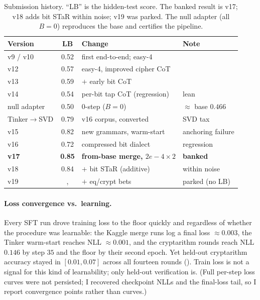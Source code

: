\documentclass[11pt]{article}
\begin{document}
\begin{table}[htbp]
\centering
\caption{Submission history. ``LB'' is the hidden-test score. The banked result is v17; v18
adds bit STaR within noise; v19 was parked. The null adapter (all $B=0$) reproduces the base
and certifies the pipeline.}
\label{tab:subs}
\small
\begin{tabular}{l c l l}
\toprule
Version & LB & Change & Note \\
\midrule
v9 / v10 & 0.52 & first end-to-end; easy-4 & \\
v12 & 0.57 & easy-4, improved cipher CoT & \\
v13 & 0.59 & $+$ early bit CoT & \\
v14 & 0.54 & per-bit tap CoT (regression) & lean \\
null adapter & 0.50 & $0$-step ($B{=}0$) & $\approx$ base $0.466$ \\
Tinker$\to$SVD & 0.79 & v16 corpus, converted & SVD tax \\
v15 & 0.82 & new grammars, warm-start & anchoring failure \\
v16 & 0.72 & compressed bit dialect & regression \\
\textbf{v17} & \textbf{0.85} & \textbf{from-base merge, $2e{-}4\times2$} & \textbf{banked} \\
v18 & 0.84 & $+$ bit STaR (additive) & within noise \\
v19 &, & $+$ eq/crypt bets & parked (no LB) \\
\bottomrule
\end{tabular}
\end{table}

\paragraph{Loss convergence vs.\ learning.} Every SFT run drove training loss to the floor
quickly and regardless of whether the procedure was learnable: the Kaggle merge runs log a
final loss $\approx\!0.003$, the Tinker warm-start reaches NLL $\approx\!0.001$, and the
cryptarithm rounds reach NLL $0.146$ by step $35$ and the floor by their second epoch. Yet
held-out cryptarithm accuracy stayed in $[0.01,0.07]$ across all fourteen rounds
(). Train loss is not a signal for this kind of learnability; only held-out
verification is. (Full per-step loss curves were not persisted; I recovered checkpoint NLLs
and the final-loss tail, so I report convergence points rather than curves.)
\end{document}
